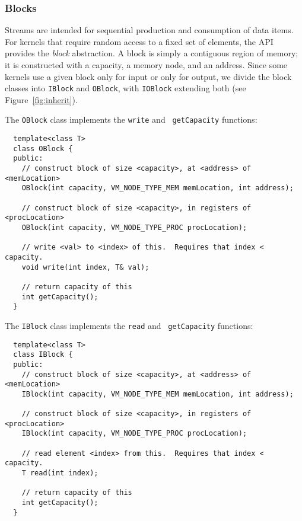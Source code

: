 
\subsubsection{Blocks}
\label{sec:blocks}

Streams are intended for sequential production and consumption of data
items.  For kernels that require random access to a fixed set of
elements, the API provides the {\it block} abstraction.  A block is
simply a contiguous region of memory; it is constructed with a
capacity, a memory node, and an address.  Since some kernels use a
given block only for input or only for output, we divide the block
classes into {\tt IBlock} and {\tt OBlock}, with {\tt IOBlock}
extending both (see Figure~\ref{fig:inherit}).

The {\tt OBlock} class implements the {\tt write} and {\tt
getCapacity} functions:

{\small
\begin{verbatim}
  template<class T>
  class OBlock {
  public:
    // construct block of size <capacity>, at <address> of <memLocation>
    OBlock(int capacity, VM_NODE_TYPE_MEM memLocation, int address);

    // construct block of size <capacity>, in registers of <procLocation>
    OBlock(int capacity, VM_NODE_TYPE_PROC procLocation);

    // write <val> to <index> of this.  Requires that index < capacity.
    void write(int index, T& val);

    // return capacity of this
    int getCapacity();
  }
\end{verbatim}}

\noindent The {\tt IBlock} class implements the {\tt read} and {\tt
getCapacity} functions:

{\small
\begin{verbatim}
  template<class T>
  class IBlock {
  public:
    // construct block of size <capacity>, at <address> of <memLocation>
    IBlock(int capacity, VM_NODE_TYPE_MEM memLocation, int address);

    // construct block of size <capacity>, in registers of <procLocation>
    IBlock(int capacity, VM_NODE_TYPE_PROC procLocation);

    // read element <index> from this.  Requires that index < capacity.
    T read(int index);

    // return capacity of this
    int getCapacity();
  }
\end{verbatim}}


